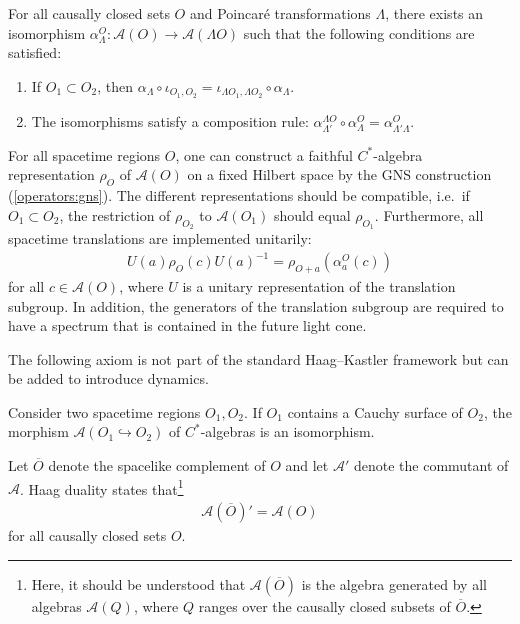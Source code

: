     \begin{axiom}
        For all causally closed sets $O$ and Poincar\'e transformations $\Lambda$, there exists an isomorphism $\alpha^O_\Lambda:\mathcal{A}(O)\rightarrow\mathcal{A}(\Lambda O)$ such that the following conditions are satisfied:
        \begin{enumerate}
            \item If $O_1\subset O_2$, then $\alpha_\Lambda\circ\iota_{O_1,O_2} = \iota_{\Lambda O_1,\Lambda O_2}\circ\alpha_\Lambda$.
            \item The isomorphisms satisfy a composition rule: $\alpha^{\Lambda O}_{\Lambda'}\circ\alpha^O_\Lambda = \alpha^O_{\Lambda'\Lambda}$.
        \end{enumerate}
    \end{axiom}

    \begin{axiom}[Spectrum]
        For all spacetime regions $O$, one can construct a faithful $C^*$-algebra representation $\rho_O$ of $\mathcal{A}(O)$ on a fixed Hilbert space by the GNS construction (\cref{operators:gns}). The different representations should be compatible, i.e.~if $O_1\subset O_2$, the restriction of $\rho_{O_2}$ to $\mathcal{A}(O_1)$ should equal $\rho_{O_1}$. Furthermore, all spacetime translations are implemented unitarily:
        \begin{gather}
            U(a)\rho_O(c)U(a)^{-1} = \rho_{O+a}\left(\alpha^O_a(c)\right)
        \end{gather}
        for all $c\in\mathcal{A}(O)$, where $U$ is a unitary representation of the translation subgroup. In addition, the generators of the translation subgroup are required to have a spectrum that is contained in the future light cone.
    \end{axiom}

    The following axiom is not part of the standard Haag--Kastler framework but can be added to introduce dynamics.
    \begin{axiom}
        Consider two spacetime regions $O_1,O_2$. If $O_1$ contains a Cauchy surface of $O_2$, the morphism $\mathcal{A}(O_1\hookrightarrow O_2)$ of $C^*$-algebras is an isomorphism.
    \end{axiom}

    \begin{axiom}
        Let $\overline{O}$ denote the spacelike complement of $O$ and let $\mathcal{A}'$ denote the commutant of $\mathcal{A}$. Haag duality states that\footnote{Here, it should be understood that $\mathcal{A}(\overline{O})$ is the algebra generated by all algebras $\mathcal{A}(Q)$, where $Q$ ranges over the causally closed subsets of $\overline{O}$.}
        \begin{gather}
            \mathcal{A}(\overline{O})' = \mathcal{A}(O)
        \end{gather}
        for all causally closed sets $O$.
    \end{axiom}

